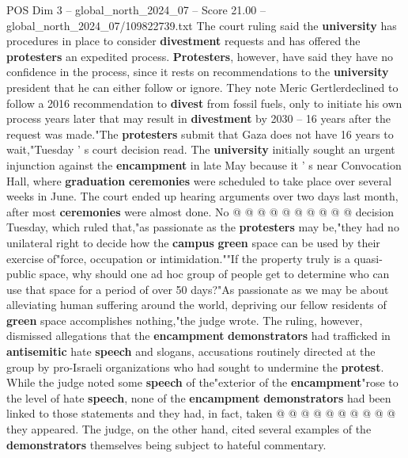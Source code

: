 \begin{textsample}{POS Dim 3 – global\_north\_2024\_07 – Score 21.00 – global\_north\_2024\_07/109822739.txt}
The court ruling said the \textbf{university} has procedures in place to consider \textbf{divestment} requests and has offered the \textbf{protesters} an expedited process. \textbf{Protesters}, however, have said they have no confidence in the process, since it rests on recommendations to the \textbf{university} president that he can either follow or ignore.
They note Meric Gertlerdeclined to follow a 2016 recommendation to \textbf{divest} from fossil fuels, only to initiate his own process years later that may result in \textbf{divestment} by 2030 -- 16 years after the request was made."The \textbf{protesters} submit that Gaza does not have 16 years to wait,"Tuesday ' s court decision read.
The \textbf{university} initially sought an urgent injunction against the \textbf{encampment} in late May because it ' s near Convocation Hall, where \textbf{graduation} \textbf{ceremonies} were scheduled to take place over several weeks in June.
The court ended up hearing arguments over two days last month, after most \textbf{ceremonies} were almost done.
No @ @ @ @ @ @ @ @ @ @ decision Tuesday, which ruled that,"as passionate as the \textbf{protesters} may be,"they had no unilateral right to decide how the \textbf{campus} \textbf{green} space can be used by their exercise of"force, occupation or intimidation.""If the property truly is a quasi-public space, why should one ad hoc group of people get to determine who can use that space for a period of over 50 days?"As passionate as we may be about alleviating human suffering around the world, depriving our fellow residents of \textbf{green} space accomplishes nothing,"the judge wrote.
The ruling, however, dismissed allegations that the \textbf{encampment} \textbf{demonstrators} had trafficked in \textbf{antisemitic} hate \textbf{speech} and slogans, accusations routinely directed at the group by pro-Israeli organizations who had sought to undermine the \textbf{protest}.
While the judge noted some \textbf{speech} of the"exterior of the \textbf{encampment}"rose to the level of hate \textbf{speech}, none of the \textbf{encampment} \textbf{demonstrators} had been linked to those statements and they had, in fact, taken @ @ @ @ @ @ @ @ @ @ they appeared.
The judge, on the other hand, cited several examples of the \textbf{demonstrators} themselves being subject to hateful commentary.

\end{textsample}
